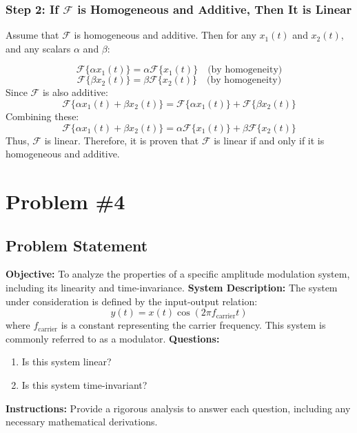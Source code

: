 \documentclass{article}
\begin{document}
\subsubsection*{Step 2: If \( \mathcal{F} \) is Homogeneous and Additive, Then It is Linear}

Assume that \( \mathcal{F} \) is homogeneous and additive. Then for any \( x_1(t) \) and \( x_2(t) \), and any scalars \( \alpha \) and \( \beta \):

\[
\mathcal{F}\{\alpha x_1(t)\} = \alpha \mathcal{F}\{x_1(t)\} \quad \text{(by homogeneity)}
\]
\[
\mathcal{F}\{\beta x_2(t)\} = \beta \mathcal{F}\{x_2(t)\} \quad \text{(by homogeneity)}
\]
Since \( \mathcal{F} \) is also additive:
\[
\mathcal{F}\{\alpha x_1(t) + \beta x_2(t)\} = \mathcal{F}\{\alpha x_1(t)\} + \mathcal{F}\{\beta x_2(t)\}
\]
Combining these:
\[
\mathcal{F}\{\alpha x_1(t) + \beta x_2(t)\} = \alpha \mathcal{F}\{x_1(t)\} + \beta \mathcal{F}\{x_2(t)\}
\]
Thus, \( \mathcal{F} \) is linear.
\newline \newline Therefore, it is proven that \( \mathcal{F} \) is linear if and only if it is homogeneous and additive.


\newpage
\section*{Problem \#4}
\subsection*{Problem Statement}
\textbf{Objective:} To analyze the properties of a specific amplitude modulation system, including its linearity and time-invariance.
\newline \newline
\textbf{System Description:} 
The system under consideration is defined by the input-output relation:
\[
y(t) = x(t) \cos(2\pi f_{\text{carrier}} t)
\]
where \( f_{\text{carrier}} \) is a constant representing the carrier frequency. This system is commonly referred to as a modulator.
\newline \newline
\textbf{Questions:}

\begin{enumerate}
    \item Is this system linear?
    \item Is this system time-invariant?
\end{enumerate}
\newline 
\textbf{Instructions:} Provide a rigorous analysis to answer each question, including any necessary mathematical derivations.
\end{document}
